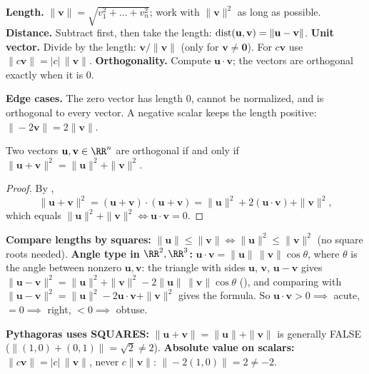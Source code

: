 \documentclass[10pt]{scrartcl}
\newcommand{\vv}[1]{\mathbf{#1}}
\newenvironment{howto}[1]{\begin{mdframed}[style=howtostyle,frametitle={#1}]}{\end{mdframed}}
\begin{document}
\begin{howto}{How to compute lengths, distances, unit vectors and orthogonality}
  \begin{steps}
    \ii \textbf{Length.} $\|\vv v\|=\sqrt{v_1^2+\dots+v_n^2}$; work with $\|\vv v\|^2$ as long as possible.
    \ii \textbf{Distance.} Subtract first, then take the length: $\dist(\vv u,\vv v)=\|\vv u-\vv v\|$.
    \ii \textbf{Unit vector.} Divide by the length: $\vv v/\|\vv v\|$ (only for $\vv v\neq\vv 0$). For $c\vv v$ use $\|c\vv v\|=|c|\,\|\vv v\|$.
    \ii \textbf{Orthogonality.} Compute $\vv u\cdot\vv v$; the vectors are orthogonal exactly when it is $0$.
  \end{steps}
  \textbf{Edge cases.} The zero vector has length $0$, cannot be normalized, and is orthogonal to every vector. A negative scalar keeps the length positive: $\|-2\vv v\|=2\|\vv v\|$.
\end{howto}

\begin{theorem*}
  Two vectors $\vv u,\vv v\in\RR^n$ are orthogonal if and only if $\|\vv u+\vv v\|^2 = \|\vv u\|^2 + \|\vv v\|^2$.
\end{theorem*}
\begin{proof}
  By ,
  \[
    \|\vv u+\vv v\|^2 = (\vv u+\vv v)\cdot(\vv u+\vv v) = \|\vv u\|^2 + 2(\vv u\cdot\vv v) + \|\vv v\|^2,
  \]
  which equals $\|\vv u\|^2+\|\vv v\|^2 \iff \vv u\cdot\vv v=0$.
\end{proof}

\begin{shortcuts}
  \ii \textbf{Compare lengths by squares:} $\|\vv u\|\le\|\vv v\| \iff \|\vv u\|^2\le\|\vv v\|^2$ (no square roots needed).
  \ii \textbf{Angle type in $\RR^2,\RR^3$:} $\vv u\cdot\vv v=\|\vv u\|\,\|\vv v\|\cos\theta$, where $\theta$ is the angle between nonzero $\vv u,\vv v$: the triangle with sides $\vv u$, $\vv v$, $\vv u-\vv v$ gives $\|\vv u-\vv v\|^2=\|\vv u\|^2+\|\vv v\|^2-2\|\vv u\|\,\|\vv v\|\cos\theta$ (), and comparing with $\|\vv u-\vv v\|^2=\|\vv u\|^2-2\vv u\cdot\vv v+\|\vv v\|^2$ gives the formula. So $\vv u\cdot\vv v>0 \implies$ acute, $=0\implies$ right, $<0\implies$ obtuse.
\end{shortcuts}

\begin{trapbox}
  \ii \textbf{Pythagoras uses SQUARES:} $\|\vv u+\vv v\|=\|\vv u\|+\|\vv v\|$ is generally FALSE ($\|(1,0)+(0,1)\|=\sqrt{2}\neq 2$).
  \ii \textbf{Absolute value on scalars:} $\|c\vv v\|=|c|\,\|\vv v\|$, never $c\|\vv v\|$: $\|-2(1,0)\|=2\neq -2$.
\end{trapbox}
\end{document}
